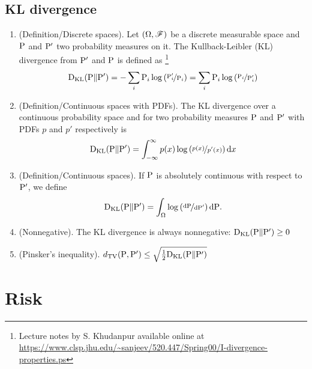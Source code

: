 \documentclass[a4paper,10pt]{scrbook}
\begin{document}
\section{KL divergence}
\begin{enumerate}
 \item (Definition/Discrete spaces). Let $(\Omega, \mathscr{F})$ be a discrete measurable space and $\mathrm{P}$ and $\mathrm{P}'$ two probability measures
       on it. The Kullback-Leibler (KL) divergence from $\mathrm{P}'$ and $\mathrm{P}$ is defined as%
	  \footnote{Lecture notes by S. Khudanpur available online at \url{https://www.clsp.jhu.edu/~sanjeev/520.447/Spring00/I-divergence-properties.ps}}
       \[
        \mathrm{D}_{\mathrm{KL}}(\mathrm{P} \| \mathrm{P}') = -\sum_i \mathrm{P}_i \log \left(\nicefrac{\mathrm{P}'_i}{\mathrm{P}_i}\right) = \sum_i \mathrm{P}_i \log \left(\nicefrac{\mathrm{P}_i}{\mathrm{P}'_i}\right)
       \]
 \item (Definition/Continuous spaces with PDFs). The KL divergence over a continuous probability space and for two 
       probability measures $\mathrm{P}$ and $\mathrm{P}'$  with PDFs $p$ and $p'$ respectively is
       \[
        \mathrm{D}_{\mathrm{KL}}(\mathrm{P} \| \mathrm{P}') = \int_{-\infty}^{\infty}p(x)\log\left(\nicefrac{p(x)}{p'(x)}\right)\mathrm{d} x
       \]       
 \item (Definition/Continuous spaces). If $\mathrm{P}$ is absolutely continuous with respect to $\mathrm{P}'$, we define
       \[
        \mathrm{D}_{\mathrm{KL}}(\mathrm{P} \| \mathrm{P}') = \int_{\Omega}\log \left( \nicefrac{\mathrm{d}\mathrm{P}}{\mathrm{d}\mathrm{P}'}\right) \mathrm{d}\mathrm{P}.
       \]

 \item (Nonnegative). The KL divergence is always nonnegative: $\mathrm{D}_{\mathrm{KL}}(\mathrm{P} \| \mathrm{P}')\geq 0$
 \item (Pinsker's inequality). $d_{\mathrm{TV}}(\mathrm{P},\mathrm{P}')\leq \sqrt{\tfrac{1}{2}\mathrm{D}_{\mathrm{KL}}(\mathrm{P}\| \mathrm{P}')}$
\end{enumerate}


\chapter{Risk}
\end{document}
